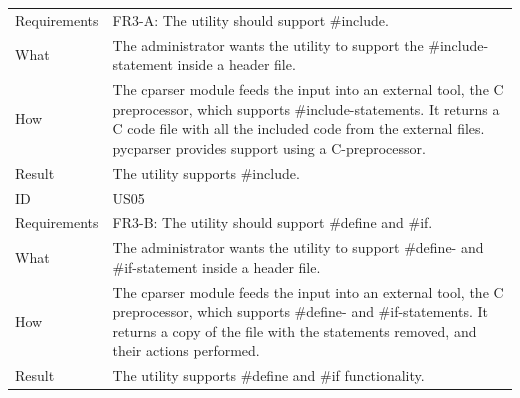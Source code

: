 \begin{table}[htbp]
{\begin{tabularx}{1.2\textwidth}{l X}
	Requirements & FR3-A: The utility should support \#include.\\
	What & The administrator wants the utility to support the \#include-statement inside a header file.\\
	How & The cparser module feeds the input into an external tool, the C preprocessor, which supports 
		\#include-statements. It returns a C code file with all the included code from the external files. pycparser
		provides support using a C-preprocessor.  \\
	Result & The utility supports \#include. \\
	\midrule
	ID & US05 \\
	Requirements & FR3-B: The utility should support \#define and \#if. \\
	What & The administrator wants the utility to support \#define- and \#if-statement inside a header file.\\
	How & The cparser module feeds the input into an external tool, the C preprocessor, which supports 
		\#define- and \#if-statements. It returns a copy of the file with the statements removed, and their actions performed. \\
	Result & The utility supports \#define and \#if functionality. \\
	\bottomrule
\end{tabularx}}
\end{table}


